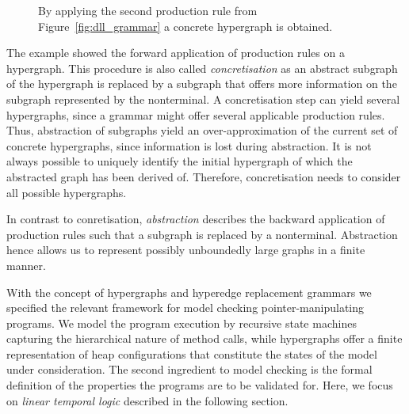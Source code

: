 \documentclass[a4paper, 12pt, twoside]{report}
\theoremstyle{plain}
\begin{document}
\begin{figure}[!h]
\begin{center}
{}
			\caption{By applying the second production rule from Figure~\ref{fig:dll_grammar} a concrete hypergraph is obtained.}\label{fig:dll_hyper_r2}
		\end{center}
	\end{figure}	

	The example showed the forward application of production rules on a hypergraph. This procedure is also called \textit{concretisation} as an abstract subgraph of the hypergraph is replaced by a subgraph that offers more information on the subgraph represented by the nonterminal. A concretisation step can yield several hypergraphs, since a grammar might offer several applicable production rules. Thus, abstraction of subgraphs yield an over-approximation of the current set of concrete hypergraphs, since information is lost during abstraction. It is not always possible to uniquely identify the initial hypergraph of which the abstracted graph has been derived of. Therefore, concretisation needs to consider all possible hypergraphs.
	
	In contrast to conretisation, \textit{abstraction} describes the backward application of production rules such that a subgraph is replaced by a nonterminal. Abstraction hence allows us to represent possibly unboundedly large graphs in a finite manner.
	
	
	With the concept of hypergraphs and hyperedge replacement grammars we specified the relevant framework for model checking pointer-manipulating programs. We model the program execution by recursive state machines capturing the hierarchical nature of method calls, while hypergraphs offer a finite representation of heap configurations that constitute the states of the model under consideration. The second ingredient to model checking is the formal definition of the properties the programs are to be validated for. Here, we focus on \textit{linear temporal logic} described in the following section.
	
\end{document}
